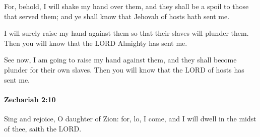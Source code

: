			\begin{versebox}
					\item[BHS] 
					\item[LXX] 
					\item[ASV] For, behold, I will shake my hand over them, and they shall be a spoil to those that served them; and ye shall know that Jehovah of hosts hath sent me.
					\item[NIV] I will surely raise my hand against them so that their slaves will plunder them. Then you will know that the LORD Almighty has sent me.
					\item[NRSV] See now, I am going to raise my hand against them, and they shall become plunder for their own slaves. Then you will know that the LORD of hosts has sent me.
			\end{versebox}

		\paragraph{Zechariah 2:10} %
			\label{ZECHARIAH-2-10}

			Sing and rejoice, O daughter of Zion: for, lo, I come, and I will dwell in the midst of thee, saith the LORD.

